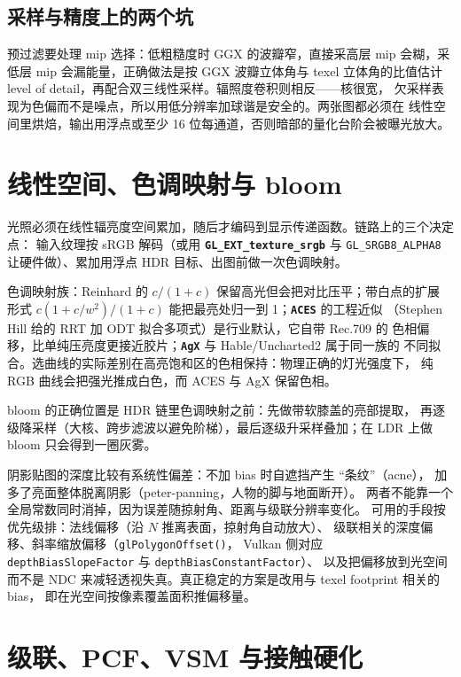\documentclass[12pt,a4paper,fontset=fandol]{ctexbook}
\newcommand{\Fn}[1]{\texttt{#1()}}
\newcommand{\Tp}[1]{\texttt{#1}}
\newcommand{\Lib}[1]{\textbf{\texttt{#1}}}
\begin{document}
\subsection{采样与精度上的两个坑}

预过滤要处理 mip 选择：低粗糙度时 GGX 的波瓣窄，直接采高层 mip 会糊，采
低层 mip 会漏能量，正确做法是按 GGX 波瓣立体角与 texel 立体角的比值估计
level of detail，再配合双三线性采样。辐照度卷积则相反------核很宽，
欠采样表现为色偏而不是噪点，所以用低分辨率加球谐是安全的。两张图都必须在
线性空间里烘焙，输出用浮点或至少 16 位每通道，否则暗部的量化台阶会被曝光放大。

\section{线性空间、色调映射与 bloom}

光照必须在线性辐亮度空间累加，随后才编码到显示传递函数。链路上的三个决定点：
输入纹理按 sRGB 解码（或用 \Lib{GL\_EXT\_texture\_srgb} 与
\Tp{GL\_SRGB8\_ALPHA8} 让硬件做）、累加用浮点 HDR 目标、出图前做一次色调映射。

色调映射族：Reinhard 的 \(c/(1+c)\) 保留高光但会把对比压平；带白点的扩展
形式 \(c(1+c/w^{2})/(1+c)\) 能把最亮处归一到 1；\Lib{ACES} 的工程近似
（Stephen Hill 给的 RRT 加 ODT 拟合多项式）是行业默认，它自带 Rec.709 的
色相偏移，比单纯压亮度更接近胶片；\Lib{AgX} 与 Hable/Uncharted2 属于同一族的
不同拟合。选曲线的实际差别在高亮饱和区的色相保持：物理正确的灯光强度下，
纯 RGB 曲线会把强光推成白色，而 ACES 与 AgX 保留色相。

bloom 的正确位置是 HDR 链里色调映射之前：先做带软膝盖的亮部提取，
再逐级降采样（大核、跨步滤波以避免阶梯），最后逐级升采样叠加；在 LDR 上做
bloom 只会得到一圈灰雾。

\begin{warning}[title={bias 与 peter-panning 是一对不可调和的误差}]
阴影贴图的深度比较有系统性偏差：不加 bias 时自遮挡产生 ``条纹''（acne），
加多了亮面整体脱离阴影（peter-panning，人物的脚与地面断开）。
两者不能靠一个全局常数同时消掉，因为误差随掠射角、距离与级联分辨率变化。
可用的手段按优先级排：法线偏移（沿 \(N\) 推离表面，掠射角自动放大）、
级联相关的深度偏移、斜率缩放偏移（\Fn{glPolygonOffset}，
Vulkan 侧对应 \Tp{depthBiasSlopeFactor} 与 \Tp{depthBiasConstantFactor}）、
以及把偏移放到光空间而不是
NDC 来减轻透视失真。真正稳定的方案是改用与 texel  footprint 相关的 bias，
即在光空间按像素覆盖面积推偏移量。
\end{warning}

\section{级联、PCF、VSM 与接触硬化}
\end{document}
